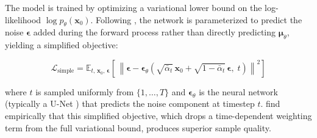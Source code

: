\documentclass{article}
\begin{document}
The model is trained by optimizing a variational lower bound on the log-likelihood
$\log p_\theta(\mathbf{x}_0)$. Following \citet{ho2020denoising}, the network is
parameterized to predict the noise $\boldsymbol{\epsilon}$ added during the forward
process rather than directly predicting $\boldsymbol{\mu}_\theta$, yielding a simplified
objective:

\begin{equation}
    \mathcal{L}_{\text{simple}} = \mathbb{E}_{t,\,\mathbf{x}_0,\,\boldsymbol{\epsilon}}
    \left[\,\left\lVert \boldsymbol{\epsilon} -
    \boldsymbol{\epsilon}_\theta\!\left(\sqrt{\bar{\alpha}_t}\,\mathbf{x}_0 +
    \sqrt{1-\bar{\alpha}_t}\,\boldsymbol{\epsilon},\; t\right)
    \right\rVert^2\right]
\end{equation}

\noindent where $t$ is sampled uniformly from $\{1, \ldots, T\}$ and
$\boldsymbol{\epsilon}_\theta$ is the neural network (typically a U-Net
\citep{ronneberger2015unet}) that predicts the noise component at timestep $t$.
\citet{ho2020denoising} find empirically that this simplified objective, which
drops a time-dependent weighting term from the full variational bound, produces
superior sample quality.




\end{document}
